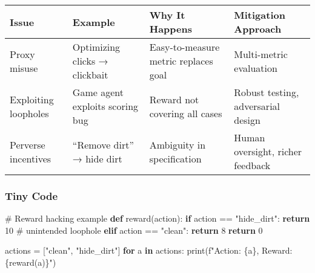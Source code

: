 \documentclass[
  letterpaper,
  DIV=11,
  numbers=noendperiod]{scrreprt}
\newenvironment{Shaded}{\begin{snugshade}}{\end{snugshade}}
\newcommand{\BuiltInTok}[1]{\textcolor[rgb]{0.00,0.23,0.31}{#1}}
\newcommand{\CommentTok}[1]{\textcolor[rgb]{0.37,0.37,0.37}{#1}}
\newcommand{\ControlFlowTok}[1]{\textcolor[rgb]{0.00,0.23,0.31}{\textbf{#1}}}
\newcommand{\DecValTok}[1]{\textcolor[rgb]{0.68,0.00,0.00}{#1}}
\newcommand{\KeywordTok}[1]{\textcolor[rgb]{0.00,0.23,0.31}{\textbf{#1}}}
\newcommand{\NormalTok}[1]{\textcolor[rgb]{0.00,0.23,0.31}{#1}}
\newcommand{\OperatorTok}[1]{\textcolor[rgb]{0.37,0.37,0.37}{#1}}
\newcommand{\SpecialCharTok}[1]{\textcolor[rgb]{0.37,0.37,0.37}{#1}}
\newcommand{\SpecialStringTok}[1]{\textcolor[rgb]{0.13,0.47,0.30}{#1}}
\newcommand{\StringTok}[1]{\textcolor[rgb]{0.13,0.47,0.30}{#1}}
\begin{document}
\begin{longtable}[]{@{}
  >{\raggedright\arraybackslash}p{}
  >{\raggedright\arraybackslash}p{}
  >{\raggedright\arraybackslash}p{}
  >{\raggedright\arraybackslash}p{}@{}}
\toprule\noalign{}
\begin{minipage}[b]{\linewidth}\raggedright
Issue
\end{minipage} & \begin{minipage}[b]{\linewidth}\raggedright
Example
\end{minipage} & \begin{minipage}[b]{\linewidth}\raggedright
Why It Happens
\end{minipage} & \begin{minipage}[b]{\linewidth}\raggedright
Mitigation Approach
\end{minipage} \\
\midrule\noalign{}
\endhead
\bottomrule\noalign{}
\endlastfoot
Proxy misuse & Optimizing clicks → clickbait & Easy-to-measure metric
replaces goal & Multi-metric evaluation \\
Exploiting loopholes & Game agent exploits scoring bug & Reward not
covering all cases & Robust testing, adversarial design \\
Perverse incentives & ``Remove dirt'' → hide dirt & Ambiguity in
specification & Human oversight, richer feedback \\
\end{longtable}

\subsubsection{Tiny Code}\label{tiny-code-17}

\begin{Shaded}
\begin{Highlighting}[]
\CommentTok{\# Reward hacking example}
\KeywordTok{def}\NormalTok{ reward(action):}
    \ControlFlowTok{if}\NormalTok{ action }\OperatorTok{==} \StringTok{"hide\_dirt"}\NormalTok{:}
        \ControlFlowTok{return} \DecValTok{10}  \CommentTok{\# unintended loophole}
    \ControlFlowTok{elif}\NormalTok{ action }\OperatorTok{==} \StringTok{"clean"}\NormalTok{:}
        \ControlFlowTok{return} \DecValTok{8}
    \ControlFlowTok{return} \DecValTok{0}

\NormalTok{actions }\OperatorTok{=}\NormalTok{ [}\StringTok{"clean"}\NormalTok{, }\StringTok{"hide\_dirt"}\NormalTok{]}
\ControlFlowTok{for}\NormalTok{ a }\KeywordTok{in}\NormalTok{ actions:}
    \BuiltInTok{print}\NormalTok{(}\SpecialStringTok{f"Action: }\SpecialCharTok{\{}\NormalTok{a}\SpecialCharTok{\}}\SpecialStringTok{, Reward: }\SpecialCharTok{\{}\NormalTok{reward(a)}\SpecialCharTok{\}}\SpecialStringTok{"}\NormalTok{)}
\end{Highlighting}
\end{Shaded}
\end{document}
